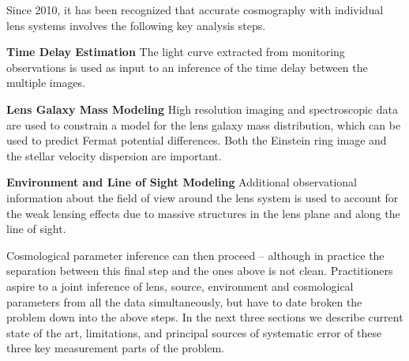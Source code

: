 Since 2010, it has been recognized that accurate cosmography with
individual lens systems involves the following key analysis steps.

\begin{description}
    \item{\bf Time Delay Estimation} The light curve extracted from
    monitoring observations is used as input to an inference of the
    time delay between the multiple images.
    \item{\bf Lens Galaxy Mass Modeling} High resolution imaging
    and spectroscopic data are used to
    constrain a model for the lens galaxy mass distribution, which can be used
    to predict Fermat potential differences. Both the Einstein ring
    image and the stellar velocity dispersion are important.
    \item{\bf Environment and Line of Sight Modeling} Additional observational
    information about the field of view around the lens system is used
    to account for the weak lensing effects due to massive structures in
    the lens plane and along the line of sight.
\end{description}

Cosmological parameter inference can then proceed -- although in
practice the  separation between this final step and the ones above is
not clean. Practitioners aspire to a joint inference of lens, source,
environment and cosmological parameters from all the data
simultaneously, but have to date broken the problem down  into the above
steps. In the next three sections we describe current state of the art,
limitations, and principal sources of systematic error of these three
key measurement parts of the problem.
